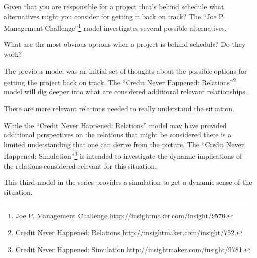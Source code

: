 \documentclass[]{memoir}
\begin{document}
Given that you are responsible for a project that's behind schedule what
alternatives might you consider for getting it back on track? The ``Joe
P. Management Challenge''\footnote{Joe P. Management Challenge
  \url{http://insightmaker.com/insight/9576}.} model investigates
several possible alternatives.

\FloatBarrier 

\begin{model}[frametitle={Model: Joe P. Management Challenge}] 

 What are the most obvious options when a project is behind schedule? Do they work?




 \end{model}

The previous model was an initial set of thoughts about the possible
options for getting the project back on track. The ``Credit Never
Happened: Relations''\footnote{Credit Never Happened: Relations
  \url{http://insightmaker.com/insight/752}.} model will dig deeper into
what are considered additional relevant relationships.

\FloatBarrier 

\begin{model}[frametitle={Model: Credit Never Happened: Relations}] 

 There are more relevant relations needed to really understand the situation.




 \end{model}

While the ``Credit Never Happened: Relations'' model may have provided
additional perspectives on the relations that might be considered there
is a limited understanding that one can derive from the picture. The
``Credit Never Happened: Simulation''\footnote{Credit Never Happened:
  Simulation \url{http://insightmaker.com/insight/9781}.} is intended to
investigate the dynamic implications of the relations considered
relevant for this situation.

\FloatBarrier 

\begin{model}[frametitle={Model: Credit Never Happened: Simulation}] 

 This third model in the series provides a simulation to get a dynamic sense of the situation.




 \end{model}
\end{document}
